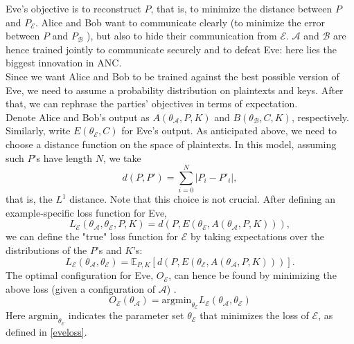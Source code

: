 \documentclass[%
    corpo=11pt,
    twoside,
    stile=classica,
    oldstyle,
    autoretitolo,
    tipotesi=magistrale,
    greek,
    evenboxes,
    english
]{toptesi}
\begin{document}
Eve's objective is to reconstruct $P$, that is, to minimize the distance between $P$ and $P_{\mathcal{E}}$. Alice and Bob want to communicate clearly (to minimize the error between $P$ and $P_{\mathcal{B}}$ ), but also to hide their communication from $\mathcal{E}$. $\mathcal{A}$ and $\mathcal{B}$ are hence trained jointly to communicate securely and to defeat Eve: here lies the biggest innovation in ANC. \\
Since we want Alice and Bob to be trained against the best possible version of Eve, we need to assume a probability distribution on plaintexts and keys. After that, we can rephrase the parties' objectives in terms of expectation. \\
Denote Alice and Bob's output as $A(\theta_{\mathcal{A}}, P, K)$ and $B(\theta_{\mathcal{B}}, C, K)$, respectively. Similarly, write $E(\theta_{\mathcal{E}}, C)$ for Eve's output. As anticipated above, we need to choose a distance function on the space of plaintexts. In this model, assuming such $P$'s have length $N$, we take
\begin{equation}
d(P,P') = \sum_{i=0}^{N}|P_i - P'_i|,
\end{equation}
that is, the $L^1$ distance. Note that this choice is not crucial.  After defining an example-specific loss function for Eve,
\begin{equation*}
L_{\mathcal{E}}\left(\theta_{\mathcal{A}}, \theta_{\mathcal{E}}, P, K \right) = d\left(P, E(\theta_{\mathcal{E}}, A(\theta_{\mathcal{A}}, P, K) ) \right),
\end{equation*}
we can define the "true" loss function for $\mathcal{E}$ by taking expectations over the distributions of the $P$'s and $K$'s:
\begin{equation}
\label{eveloss}
L_{\mathcal{E}}\left(\theta_{\mathcal{A}}, \theta_{\mathcal{E}}\right) = \mathbb{E}_{P,K} \left[ d\left(P, E(\theta_{\mathcal{E}}, A(\theta_{\mathcal{A}}, P, K) ) \right)\right].
\end{equation}
The optimal configuration for Eve, $O_{\mathcal{E}}$, can hence be found by minimizing the above loss (given a configuration of $\mathcal{A}$) .
\begin{equation}
O_{\mathcal{E}}\left(\theta_{\mathcal{A}} \right) = \textrm{argmin}_{\theta_{\mathcal{E}}}L_{\mathcal{E}}\left(\theta_{\mathcal{A}}, \theta_{\mathcal{E}}\right)
\end{equation}
Here $\textrm{argmin}_{\theta_{\mathcal{E}}}$ indicates the parameter set $\theta_{\mathcal{E}}$ that minimizes the loss of $\mathcal{E}$, as defined in \eqref{eveloss}.\\
\end{document}
